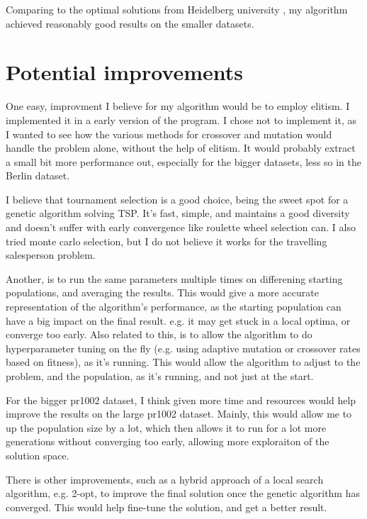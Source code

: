 \documentclass[11pt]{scrartcl} %
\begin{document}
Comparing to the optimal solutions from Heidelberg university \cite{heidelberg_university_best_known}, my algorithm achieved reasonably good results on the smaller datasets.


\section{Potential improvements}
\label{Potential improvements}



One easy, improvment I believe for my algorithm would be to employ elitism.
I implemented it in a early version of the program. I chose not to implement it, as I wanted to see how the various methods for crossover and mutation would handle the problem alone, without the help of elitism.
It would probably extract a small bit more performance out, especially for the bigger datasets, less so in the Berlin dataset.

I believe that tournament selection is a good choice, being the sweet spot for a genetic algorithm solving TSP. It's fast, simple, and maintains a good diversity and doesn't suffer with early convergence like roulette wheel selection can\cite{genetic_algorithm_afternoon}.
I also tried monte carlo selection, but I do not believe it works for the travelling salesperson problem.

Another, is to run the same parameters multiple times on differening starting populations, and averaging the results. This would give a more accurate representation of the algorithm's performance, as the starting population can have a big impact on the final result. e.g. it may get stuck in a local optima, or converge too early.
Also related to this, is to allow the algorithm to do hyperparameter tuning on the fly (e.g. using adaptive mutation or crossover rates based on fitness), as it's running. This would allow the algorithm to adjust to the problem, and the population, as it's running, and not just at the start.

For the bigger pr1002 dataset, I think given more time and resources would help improve the results on the large pr1002 dataset. 
Mainly, this would allow me to up the population size by a lot, which then allows it to run for a lot more generations without converging too early, allowing more exploraiton of the solution space.

There is other improvements, such as a hybrid approach of a local search algorithm, e.g. 2-opt, to improve the final solution once the genetic algorithm has converged. This would help fine-tune the solution, and get a better result.

\printbibliography
\end{document}

